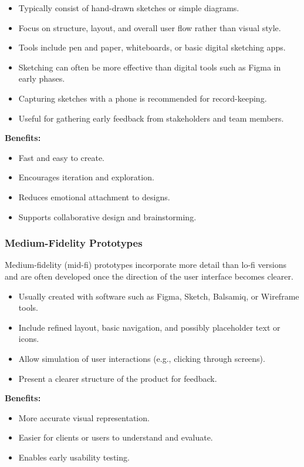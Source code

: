 \documentclass{article}
\begin{document}
\begin{itemize}
    \item Typically consist of hand-drawn sketches or simple diagrams.
    \item Focus on structure, layout, and overall user flow rather than visual style.
    \item Tools include pen and paper, whiteboards, or basic digital sketching apps.
    \item Sketching can often be more effective than digital tools such as Figma in early phases.
    \item Capturing sketches with a phone is recommended for record-keeping.
    \item Useful for gathering early feedback from stakeholders and team members.
\end{itemize}

\textbf{Benefits:}
\begin{itemize}
    \item Fast and easy to create.
    \item Encourages iteration and exploration.
    \item Reduces emotional attachment to designs.
    \item Supports collaborative design and brainstorming.
\end{itemize}

\subsubsection{Medium-Fidelity Prototypes}

Medium-fidelity (mid-fi) prototypes incorporate more detail than lo-fi versions and are often developed once the direction of the user interface becomes clearer.

\begin{itemize}
    \item Usually created with software such as Figma, Sketch, Balsamiq, or Wireframe tools.
    \item Include refined layout, basic navigation, and possibly placeholder text or icons.
    \item Allow simulation of user interactions (e.g., clicking through screens).
    \item Present a clearer structure of the product for feedback.
\end{itemize}

\textbf{Benefits:}
\begin{itemize}
    \item More accurate visual representation.
    \item Easier for clients or users to understand and evaluate.
    \item Enables early usability testing.
\end{itemize}
\end{document}
